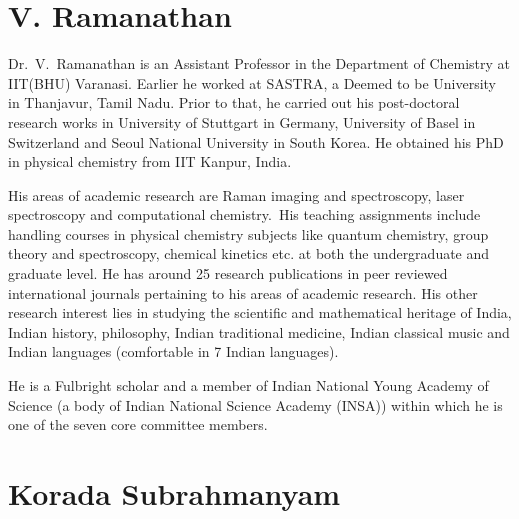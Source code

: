 \vspace{-.3cm}

\section*{V. Ramanathan}

\vspace{-.2cm}

Dr.~V.~Ramanathan is an Assistant Professor in the Department of Chemistry at IIT(BHU) Varanasi. Earlier he worked at SASTRA, a Deemed to be University in Thanjavur, Tamil Nadu. Prior to that, he carried out his post-doctoral research works in University of Stuttgart in Germany, University of Basel in Switzerland and Seoul National University in South Korea. He obtained his PhD in physical chemistry from IIT Kanpur, India.

His areas of academic research are Raman imaging and spectroscopy, laser spectroscopy and computational chemistry.~His teaching assignments include handling courses in physical chemistry subjects like qua\-ntum chemistry, group theory and spectroscopy, chemical kinetics etc. at both the undergraduate and graduate level. He has around 25 research publications in peer reviewed international journals pertaining to his areas of academic research. His other research interest lies in studying the scientific and mathematical heritage of India, Indian history, philosophy, Indian traditional medicine, Indian classical music and Indian languages (comfortable in 7 Indian languages).

He is a Fulbright scholar and a member of Indian National Young Academy of Science (a body of Indian National Science Academy (INSA)) within which he is one of the seven core committee members.

\vspace{-.3cm}

\section*{Korada Subrahmanyam }

\vspace{-.2cm}

